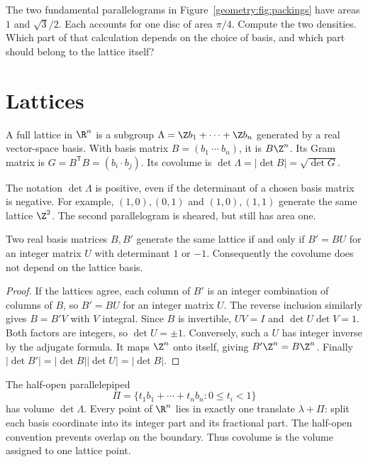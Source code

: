 \begin{think}
The two fundamental parallelograms in Figure~\ref{geometry:fig:packings}
have areas $1$ and $\sqrt3/2$. Each accounts for one disc of area $\pi/4$.
Compute the two densities. Which part of that calculation depends on the
choice of basis, and which part should belong to the lattice itself?
\end{think}

\section{Lattices}

\begin{definition}
A full lattice in $\R^n$ is a subgroup
$\Lambda=\Z b_1+\cdots+\Z b_n$ generated by a real vector-space basis.
With basis matrix $B=(b_1\ \cdots\ b_n)$, it is $B\Z^n$.
Its Gram matrix is $G=B^{\mathsf T}B=(b_i\cdot b_j)$.
Its covolume is $\det\Lambda=|\det B|=\sqrt{\det G}$.
\end{definition}

The notation $\det\Lambda$ is positive, even if the determinant of a
chosen basis matrix is negative. For example, $(1,0),(0,1)$ and
$(1,0),(1,1)$ generate the same lattice $\Z^2$. The second parallelogram
is sheared, but still has area one.

\begin{proposition}\label{geometry:prop:latticebases}
Two real basis matrices $B,B'$ generate the same lattice if and only if
$B'=BU$ for an integer matrix $U$ with determinant $1$ or $-1$.
Consequently the covolume does not depend on the lattice basis.
\end{proposition}
\begin{proof}
If the lattices agree, each column of $B'$ is an integer combination of
columns of $B$, so $B'=BU$ for an integer matrix $U$.
The reverse inclusion similarly gives $B=B'V$ with $V$ integral.
Since $B$ is invertible, $UV=I$ and
$\det U\det V=1$. Both factors are integers, so $\det U=\pm1$.
Conversely, such a $U$ has integer inverse by the adjugate formula.
It maps $\Z^n$ onto itself, giving $B'\Z^n=B\Z^n$.
Finally $|\det B'|=|\det B||\det U|=|\det B|$.
\end{proof}

The half-open parallelepiped
\[
 \Pi=\{t_1b_1+\cdots+t_nb_n:0\le t_i<1\}
\]
has volume $\det\Lambda$. Every point of $\R^n$ lies in exactly one
translate $\lambda+\Pi$: split each basis coordinate into its integer
part and its fractional part. The half-open convention prevents overlap
on the boundary. Thus covolume is the volume assigned to one lattice point.

